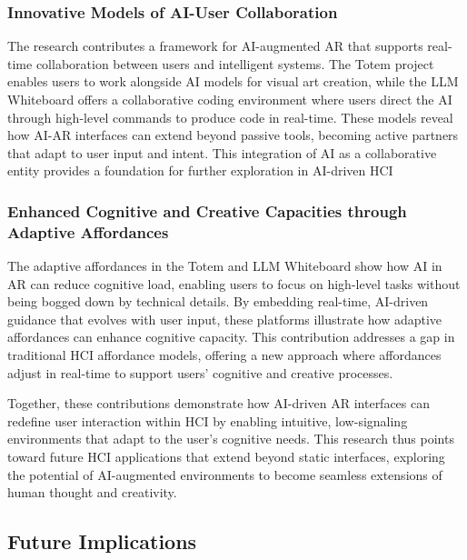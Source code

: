 \subsubsection{Innovative Models of AI-User Collaboration}
The research contributes a framework for AI-augmented AR that supports real-time collaboration between users and intelligent systems.
The Totem project enables users to work alongside AI models for visual art creation, while the LLM Whiteboard offers a collaborative coding environment where users direct the AI through high-level commands to produce code in real-time.
These models reveal how AI-AR interfaces can extend beyond passive tools, becoming active partners that adapt to user input and intent.
This integration of AI as a collaborative entity provides a foundation for further exploration in AI-driven HCI%

\subsubsection{Enhanced Cognitive and Creative Capacities through Adaptive Affordances}
The adaptive affordances in the Totem and LLM Whiteboard show how AI in AR can reduce cognitive load, enabling users to focus on high-level tasks without being bogged down by technical details.
By embedding real-time, AI-driven guidance that evolves with user input, these platforms illustrate how adaptive affordances can enhance cognitive capacity.
This contribution addresses a gap in traditional HCI affordance models, offering a new approach where affordances adjust in real-time to support users’ cognitive and creative processes.


Together, these contributions demonstrate how AI-driven AR interfaces can redefine user interaction within HCI by enabling intuitive, low-signaling environments that adapt to the user’s cognitive needs.%
This research thus points toward future HCI applications that extend beyond static interfaces, exploring the potential of AI-augmented environments to become seamless extensions of human thought and creativity.

\subsection{Future Implications}

